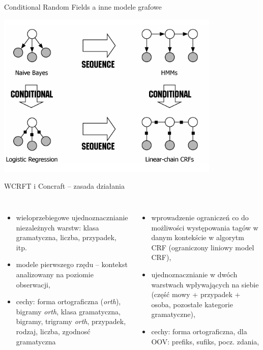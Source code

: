 \documentclass[xcolor=dvipsnames,polish]{beamer}
\begin{document}
\begin{frame}{Conditional Random Fields a inne modele grafowe}
  \begin{center}
    \includegraphics[width=0.8\textwidth]{img/pgms.png}
  \end{center}
\end{frame}

\begin{frame}{WCRFT i Concraft -- zasada działania}
\begin{columns}[t]
  \begin{itemize}
    \item wieloprzebiegowe ujednoznacznianie niezależnych warstw: klasa gramatyczna, liczba, przypadek, itp.
    \item modele pierwszego rzędu -- kontekst analizowany na poziomie obserwacji,
    \item cechy: forma ortograficzna (\emph{orth}), bigramy \emph{orth}, klasa gramatyczna, bigramy, trigramy \emph{orth}, przypadek, rodzaj, liczba, zgodnosć gramatyczna
  \end{itemize}
  \begin{itemize}
    \item wprowadzenie ograniczeń co do możliwości występowania tagów w danym kontekście w algorytm CRF (ograniczony liniowy model CRF),
    \item ujednoznacznianie w dwóch warstwach wpływających na siebie (część mowy + przypadek + osoba, pozostałe kategorie gramatyczne),
    \item cechy: forma ortograficzna, dla OOV: prefiks, sufiks, pocz. zdania,
  \end{itemize}
\end{columns}
\end{frame}
\end{document}
